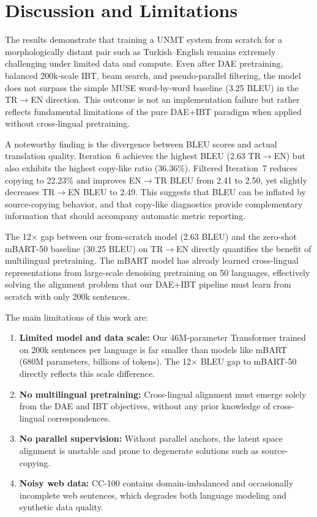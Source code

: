\documentclass[runningheads]{llncs}
\begin{document}
\section{Discussion and Limitations}

The results demonstrate that training a UNMT system from scratch for a morphologically distant pair such as Turkish--English remains extremely challenging under limited data and compute. Even after DAE pretraining, balanced 200k-scale IBT, beam search, and pseudo-parallel filtering, the model does not surpass the simple MUSE word-by-word baseline (3.25 BLEU) in the TR$\rightarrow$EN direction. This outcome is not an implementation failure but rather reflects fundamental limitations of the pure DAE+IBT paradigm when applied without cross-lingual pretraining.

A noteworthy finding is the divergence between BLEU scores and actual translation quality. Iteration~6 achieves the highest BLEU (2.63 TR$\rightarrow$EN) but also exhibits the highest copy-like ratio (36.36\%). Filtered Iteration~7 reduces copying to 22.23\% and improves EN$\rightarrow$TR BLEU from 2.41 to 2.50, yet slightly decreases TR$\rightarrow$EN BLEU to 2.49. This suggests that BLEU can be inflated by source-copying behavior, and that copy-like diagnostics provide complementary information that should accompany automatic metric reporting.

The 12$\times$ gap between our from-scratch model (2.63 BLEU) and the zero-shot mBART-50 baseline (30.25 BLEU) on TR$\rightarrow$EN directly quantifies the benefit of multilingual pretraining. The mBART model has already learned cross-lingual representations from large-scale denoising pretraining on 50 languages, effectively solving the alignment problem that our DAE+IBT pipeline must learn from scratch with only 200k sentences.

The main limitations of this work are:
\begin{enumerate}
    \item \textbf{Limited model and data scale:} Our 46M-parameter Transformer trained on 200k sentences per language is far smaller than models like mBART (680M parameters, billions of tokens). The 12$\times$ BLEU gap to mBART-50 directly reflects this scale difference.
    \item \textbf{No multilingual pretraining:} Cross-lingual alignment must emerge solely from the DAE and IBT objectives, without any prior knowledge of cross-lingual correspondences.
    \item \textbf{No parallel supervision:} Without parallel anchors, the latent space alignment is unstable and prone to degenerate solutions such as source-copying.
    \item \textbf{Noisy web data:} CC-100 contains domain-imbalanced and occasionally incomplete web sentences, which degrades both language modeling and synthetic data quality.
\end{enumerate}
\end{document}
